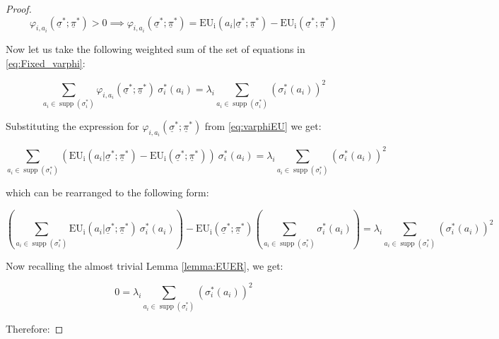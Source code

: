 \documentclass{article}
\theoremstyle{definition}
\DeclareMathOperator\supp{supp}
\begin{document}
\begin{proof}
\begin{equation}
\label{eq:varphiEU}
    \varphi_{i,a_i}(\underline{\sigma}^*;\underline{\pi}^*) > 0
    \implies
    \varphi_{i,a_i}(\underline{\sigma}^*;\underline{\pi}^*)
    =
    \mathrm{EU_i}(a_i|\underline{\sigma}^*;\underline{\pi}^*)
    -
    \mathrm{EU_i}(\underline{\sigma}^*;\underline{\pi}^*)
\end{equation}

Now let us take the following weighted sum of the set of equations in \eqref{eq:Fixed_varphi}:

\begin{equation}
    \sum_{a_i \in \supp(\sigma_i^*)} \varphi_{i,a_i}(\underline{\sigma}^*;\underline{\pi}^*)
    \ \sigma_i^*(a_i)
    =
    \lambda_i
    \sum_{a_i \in \supp(\sigma_i^*)} \left ( \sigma_i^*(a_i) \right )^2
\end{equation}

Substituting the expression for $\varphi_{i,a_i}(\underline{\sigma}^*;\underline{\pi}^*)$ from \eqref{eq:varphiEU} we get:

\begin{equation}
    \sum_{a_i \in \supp(\sigma_i^*)} 
    \left (
    \mathrm{EU_i}(a_i|\underline{\sigma}^*;\underline{\pi}^*)
    -
    \mathrm{EU_i}(\underline{\sigma}^*;\underline{\pi}^*)
    \right )
    \ 
    \sigma_i^*(a_i) 
    =
    \lambda_i
    \sum_{a_i \in \supp(\sigma_i^*)} \left ( \sigma_i^*(a_i) \right )^2
\end{equation}

which can be rearranged to the following form:

\begin{equation}
    \left (
    \sum_{a_i \in \supp(\sigma_i^*)} 
    \mathrm{EU_i}(a_i|\underline{\sigma}^*;\underline{\pi}^*)
    \ \sigma_i^*(a_i) 
    \right )
    -
    \mathrm{EU_i}(\underline{\sigma}^*;\underline{\pi}^*)
    \left (
    \sum_{a_i \in \supp(\sigma_i^*)} \sigma_i^*(a_i) 
    \right )
    =
    \lambda_i
    \sum_{a_i \in \supp(\sigma_i^*)} \left ( \sigma_i^*(a_i) \right )^2
\end{equation}

Now recalling the almost trivial Lemma \autoref{lemma:EUER}, we get:

\begin{equation}
    0
    =
    \lambda_i
    \sum_{a_i \in \supp(\sigma_i^*)} \left ( \sigma_i^*(a_i) \right )^2
\end{equation}

Therefore:


\end{proof}
\end{document}
